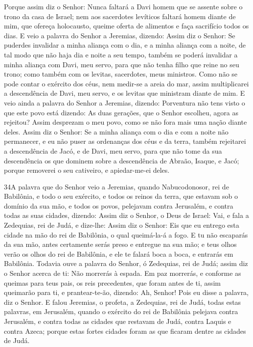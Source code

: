 Porque assim diz o Senhor: Nunca faltará a Davi homem que se
assente sobre o trono da casa de Israel; nem aos sacerdotes
levíticos faltará homem diante de mim, que ofereça holocausto,
queime oferta de alimentos e faça sacrifício todos os dias. E
veio a palavra do Senhor a Jeremias, dizendo: Assim diz o
Senhor: Se puderdes invalidar a minha aliança com o dia, e a minha
aliança com a noite, de tal modo que não haja dia e noite a seu
tempo, também se poderá invalidar a minha aliança com Davi,
meu servo, para que não tenha filho que reine no seu trono; como
também com os levitas, sacerdotes, meus ministros. Como não
se pode contar o exército dos céus, nem medir-se a areia do mar,
assim multiplicarei a descendência de Davi, meu servo, e os levitas
que ministram diante de mim. E veio ainda a palavra do Senhor
a Jeremias, dizendo: Porventura não tens visto o que este
povo está dizendo: As duas gerações, que o Senhor escolheu, agora as
rejeitou? Assim desprezam o meu povo, como se não fora mais uma
nação diante deles. Assim diz o Senhor: Se a minha aliança
com o dia e com a noite não permanecer, e eu não puser as ordenanças
dos céus e da terra, também rejeitarei a descendência de
Jacó, e de Davi, meu servo, para que não tome da sua descendência os
que dominem sobre a descendência de Abraão, Isaque, e Jacó; porque
removerei o seu cativeiro, e apiedar-me-ei deles.

\medskip

\lettrine{34} A palavra que do Senhor veio a Jeremias, quando
Nabucodonosor, rei de Babilônia, e todo o seu exército, e todos os
reinos da terra, que estavam sob o domínio da sua mão, e todos os
povos, pelejavam contra Jerusalém, e contra todas as suas cidades,
dizendo: Assim diz o Senhor, o Deus de Israel: Vai, e fala a
Zedequias, rei de Judá, e dize-lhe: Assim diz o Senhor: Eis que eu
entrego esta cidade na mão do rei de Babilônia, o qual queimá-la-á a
fogo. E tu não escaparás da sua mão, antes certamente serás
preso e entregue na sua mão; e teus olhos verão os olhos do rei de
Babilônia, e ele te falará boca a boca, e entrarás em Babilônia.
Todavia ouve a palavra do Senhor, ó Zedequias, rei de Judá;
assim diz o Senhor acerca de ti: Não morrerás à espada. Em paz
morrerás, e conforme as queimas para teus pais, os reis precedentes,
que foram antes de ti, assim queimarão para ti, e prantear-te-ão,
dizendo: Ah, Senhor! Pois eu disse a palavra, diz o Senhor. E
falou Jeremias, o profeta, a Zedequias, rei de Judá, todas estas
palavras, em Jerusalém, quando o exército do rei de Babilônia
pelejava contra Jerusalém, e contra todas as cidades que restavam de
Judá, contra Laquis e contra Azeca; porque estas fortes cidades
foram as que ficaram dentre as cidades de Judá.

